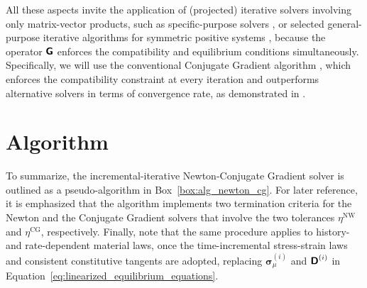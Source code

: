 All these aspects invite the application of (projected) iterative solvers involving only matrix-vector products, such as specific-purpose solvers \citep{moulinec_comparison_2014}, or selected general-purpose iterative algorithms for symmetric positive systems \citep{mishra_comparative_2016}, because the operator \(\boldsymbol{\mathsf{G}}\) enforces the compatibility and equilibrium conditions simultaneously.
Specifically, we will use the conventional Conjugate Gradient algorithm \citep{hestenes_methods_1952}, which enforces the compatibility constraint at every iteration and outperforms alternative solvers in terms of convergence rate, as demonstrated in \cite{mishra_comparative_2016}.

\section{Algorithm}

To summarize, the incremental-iterative Newton-Conjugate Gradient solver is outlined as a pseudo-algorithm in Box~\ref{box:alg_newton_cg}.
For later reference, it is emphasized that the algorithm implements two termination criteria for the Newton and the Conjugate Gradient solvers that involve the two tolerances \(\eta^{\mathrm{NW}}\) and \(\eta^{\mathrm{CG}}\), respectively.
Finally, note that the same procedure applies to history- and rate-dependent material laws, once the time-incremental stress-strain laws and consistent constitutive tangents are adopted, replacing \(\bm\sigma_\mu^{(i)}\) and \(\boldsymbol{\mathsf{D}}^{(i)}\) in Equation~\eqref{eq:linearized_equilibrium_equations}.

